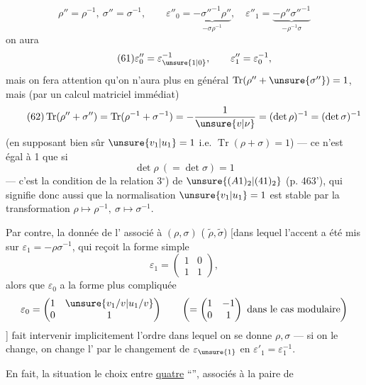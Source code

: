 


\[
\tag{60}
\rho''=\rho^{-1},\ \sigma''=\sigma^{-1},\qquad
\varepsilon''_0=\underbrace{-\sigma''^{-1}\rho''}_{-\sigma\rho^{-1}},\quad
\varepsilon''_1=\underbrace{-\rho''\sigma''^{-1}}_{-\rho^{-1}\sigma}
\]
on aura
\[
\tag{61}
\varepsilon''_0=\varepsilon_{\unsure{1|0}}^{-1},\qquad
\varepsilon''_1=\varepsilon_0^{-1},
\]
mais on fera attention qu'on n'aura plus en général $\operatorname{Tr}(\rho''+\unsure{\sigma''})=1$, mais (par un calcul matriciel immédiat)
\[
\tag{62}
\operatorname{Tr}(\rho''+\sigma'')
=\operatorname{Tr}(\rho^{-1}+\sigma^{-1})
=-\frac{1}{\unsure{v|\nu}}
=(\det\rho)^{-1}=(\det\sigma)^{-1}
\]
(en supposant bien sûr  $\unsure{v_1|u_1}=1$ i.e. $\operatorname{Tr}(\rho+\sigma)=1$)
--- ce n'est égal à 1 que si
\[
\tag{63}
\det\rho\ (=\det\sigma)=1
\]
--- c'est la condition de la relation 3$^\circ$) de $\unsure{(A1)_2|(41)_2}$ (p. 463'), qui signifie donc aussi que la normalisation $\unsure{v_1|u_1}=1$ est stable par la transformation $\rho\mapsto\rho^{-1},\ \sigma\mapsto\sigma^{-1}$.

Par contre, la donnée de l'\uline{} associé à $(\rho,\sigma)$ ( $\widetilde\rho,\widetilde\sigma$) [dans lequel l'accent a été mis sur $\varepsilon_1=-\rho\sigma^{-1}$, qui reçoit la forme simple
\[
\varepsilon_1=\begin{pmatrix}1&0\\1&1\end{pmatrix},
\]
alors que $\varepsilon_0$  a la forme plus compliquée
\[
\varepsilon_0=\begin{pmatrix}1&\unsure{v_1/v|u_1/v}\\0&1\end{pmatrix}
\qquad\left(=\begin{pmatrix}1&-1\\0&1\end{pmatrix}\text{ dans le cas modulaire}\right)
\]
] fait intervenir implicitement l'ordre dans lequel on se donne $\rho,\sigma$ --- si on le change, on change l' par le changement de $\varepsilon_{\unsure{1}}$ en $\varepsilon'_1=\varepsilon_1^{-1}$.

En fait, la situation  le choix entre \uline{quatre}  ``'', associés à la paire de


